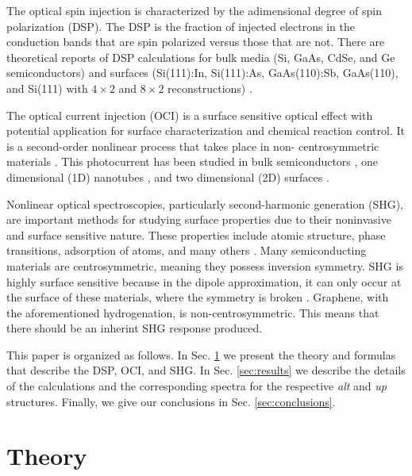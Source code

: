 \documentclass[pss]{wiley2sp} %
\begin{document}
The optical spin injection is characterized by the adimensional degree of spin polarization (DSP). The DSP is the fraction of injected electrons in the conduction bands that are spin polarized versus those that are not. There are theoretical reports of DSP calculations for bulk media (Si, GaAs, CdSe, and Ge semiconductors) \cite{nastosPRB07,cabellosPRB09,riouxPRB10} and surfaces (Si(111):In, Si(111):As, GaAs(110):Sb, GaAs(110), and Si(111) with $4\times2$ and $8\times2$ reconstructions) \cite{mendozaPRB12,arzatePRB14}.

The optical current injection (OCI) is a surface sensitive optical effect with potential application for surface characterization and chemical reaction control. It is a second-order nonlinear process that takes place in non- centrosymmetric materials \cite{nastosPRB06,cabellosPRB11,bhatPRB05,fraserPRL99}. This photocurrent has been studied in bulk semiconductors \cite{atanasovPRL96,sipePRB00}, one dimensional (1D) nanotubes \cite{melePRB00,kralPRL00}, and two dimensional (2D) surfaces \cite{melePRB00,cabellosPRB11}.

Nonlinear optical spectroscopies, particularly second-harmonic generation (SHG), are important methods for studying surface properties due to their noninvasive and surface sensitive nature. These properties include atomic structure, phase transitions, adsorption of atoms, and many others  \cite{dadapPRB97,daumPRL93,mcgilpOE94,powerPRL95,godefroyAPL96,salazarPRB14,chenPRL81,mendozaPRL98}. Many semiconducting materials are centrosymmetric, meaning they possess inversion symmetry. SHG is highly surface sensitive because in the dipole approximation, it can only occur at the surface of these materials, where the symmetry is broken \cite{bloembergenPR62,andersonPRB15,sipePRB00}. Graphene, with the aforementioned hydrogenation, is non-centrosymmetric. This means that there should be an inherint SHG response produced.

This paper is organized as follows. In Sec. \ref{sec:theory} we present the theory and formulas that describe the DSP, OCI, and SHG. In Sec. \ref{sec:results} we describe the details of the calculations and the corresponding spectra for the respective \emph{alt} and \emph{up} structures. Finally, we give our conclusions in Sec. \ref{sec:conclusions}.


\section{Theory}\label{sec:theory}
\end{document}
